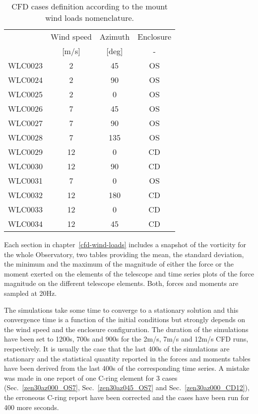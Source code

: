 \begin{table}
  \centering
  \begin{tabular}{cccc}\toprule
    & Wind speed & Azimuth & Enclosure\\
    & [m/s]       & [deg]   & - \\\midrule
    WLC0023 &  2  &  45     & OS \\
    WLC0024 &  2  &  90     & OS \\
    WLC0025 &  2  &   0     & OS \\
    WLC0026 &  7  &  45     & OS \\
    WLC0027 &  7  &  90     & OS \\
    WLC0028 &  7  & 135     & OS \\
    WLC0029 & 12  &   0     & CD \\
    WLC0030 & 12  &  90     & CD \\
    WLC0031 &  7  &   0     & OS \\
    WLC0032 & 12  & 180     & CD \\
    WLC0033 & 12  &   0     & CD \\
    WLC0034 & 12  &  45     & CD \\
    \bottomrule
  \end{tabular}
  \caption{CFD cases definition according to the mount wind loads nomenclature.}
  \label{tab:mount-cases}
\end{table}


Each section in  chapter~\ref{cfd-wind-loads} includes a snapshot of the vorticity for the whole Observatory,
two tables providing the mean, the standard deviation, the minimum and the
maximum of the magnitude of either the force or the moment exerted on the
elements of the telescope and time series plots of the force magnitude on the
different telescope elements.
Both, forces and moments are sampled at 20Hz.

The simulations take some time to converge to a stationary solution and this convergence time is a function of the initial conditions but strongly depends on the wind speed and the enclosure configuration.
The duration of the simulations have been set to 1200s, 700s and 900s for the 2m/s, 7m/s and 12m/s CFD runs, respectively.
It is usually the case that the last 400s of the simulations are stationary and
the statistical quantity reported in the forces and moments tables have been derived from
the last 400s of the corresponding time series.
A mistake was made in one report of one C-ring element for 3 cases (Sec.~\ref{zen30az000_OS7}, Sec.~\ref{zen30az045_OS7} and Sec.~\ref{zen30az000_CD12}), the erroneous C-ring report have been corrected and the cases have been run for 400 more seconds. 



